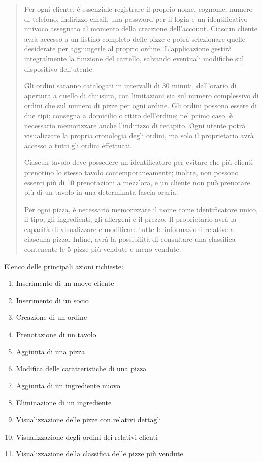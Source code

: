 \documentclass[a4paper,12pt, oneside]{article}
\begin{document}
\begin{quote}

Per ogni cliente, è essenziale registrare il proprio nome, cognome,
numero di telefono, indirizzo email, una password per il login e un
identificativo univoco assegnato al momento della creazione
dell'account. Ciascun cliente avrà accesso a un listino completo delle
pizze e potrà selezionare quelle desiderate per aggiungerle al proprio
ordine. L'applicazione gestirà integralmente la funzione del carrello,
salvando eventuali modifiche sul dispositivo dell'utente.

Gli ordini saranno catalogati in intervalli di 30 minuti,
dall'orario di apertura a quello di chiusura, con limitazioni sia sul
numero complessivo di ordini che sul numero di pizze per ogni ordine.
Gli ordini possono essere di due tipi: consegna a domicilio o ritiro
dell'ordine; nel primo caso, è necessario memorizzare anche
l'indirizzo di recapito. Ogni utente potrà visualizzare la propria
cronologia degli ordini, ma solo il proprietario avrà accesso a tutti
gli ordini effettuati.

Ciascun tavolo deve possedere un identificatore per evitare che più
clienti prenotino lo stesso tavolo contemporaneamente; inoltre, non
possono esserci più di 10 prenotazioni a mezz'ora, e un cliente non
può prenotare più di un tavolo in una determinata fascia oraria.

Per ogni pizza, è necessario memorizzare il nome come identificatore
unico, il tipo, gli ingredienti, gli allergeni e il prezzo. Il
proprietario avrà la capacità di visualizzare e modificare tutte le
informazioni relative a ciascuna pizza. Infine, avrà la possibilità
di consultare una classifica contenente le 5 pizze più vendute e
meno vendute.

\end{quote}

Elenco delle principali azioni richieste:
\begin{enumerate}
    \item Inserimento di un nuovo cliente
    \item Inserimento di un socio
    \item Creazione di un ordine
    \item Prenotazione di un tavolo
    \item Aggiunta di una pizza
    \item Modifica delle caratteristiche di una pizza
    \item Aggiunta di un ingrediente nuovo
    \item Eliminazione di un ingrediente
    \item Visualizzazione delle pizze con relativi dettagli
    \item Visualizzazione degli ordini dei relativi clienti
    \item Visualizzazione della classifica delle pizze più vendute
\end{enumerate}
\end{document}
